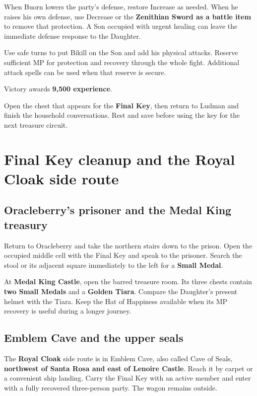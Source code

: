 When Buorn lowers the party's defense, restore Increase as
needed. When he raises his own defense, use Decrease or the
\textbf{Zenithian Sword as a battle item} to remove that
protection. A Son occupied with urgent healing can leave the
immediate defense response to the Daughter.

Use safe turns to put Bikill on the Son and add his physical
attacks. Reserve sufficient MP for protection and recovery
through the whole fight. Additional attack spells can be used
when that reserve is secure.

Victory awards \textbf{9,500 experience}.


Open the chest that appears for the \textbf{Final Key}, then return to
Ludman and finish the household conversations. Rest and save
before using the key for the next treasure circuit.

\section{Final Key cleanup and the Royal Cloak side route}

\subsection*{Oracleberry's prisoner and the Medal King treasury}

Return to Oracleberry and take the northern stairs down to
the prison. Open the occupied middle cell with the Final Key
and speak to the prisoner. Search the stool or its adjacent
square immediately to the left for a \textbf{Small Medal}.

At \textbf{Medal King Castle}, open the barred treasure room.
Its three chests contain \textbf{two Small Medals} and a
\textbf{Golden Tiara}. Compare the Daughter's present helmet
with the Tiara. Keep the Hat of Happiness available when its
MP recovery is useful during a longer journey.

\subsection*{Emblem Cave and the upper seals}

The \textbf{Royal Cloak} side route is in Emblem Cave,
also called Cave of Seals, \textbf{northwest of Santa Rosa
and east of Lenoire Castle}. Reach it by carpet or a
convenient ship landing. Carry the Final Key with an active
member and enter with a fully recovered three-person party.
The wagon remains outside.

